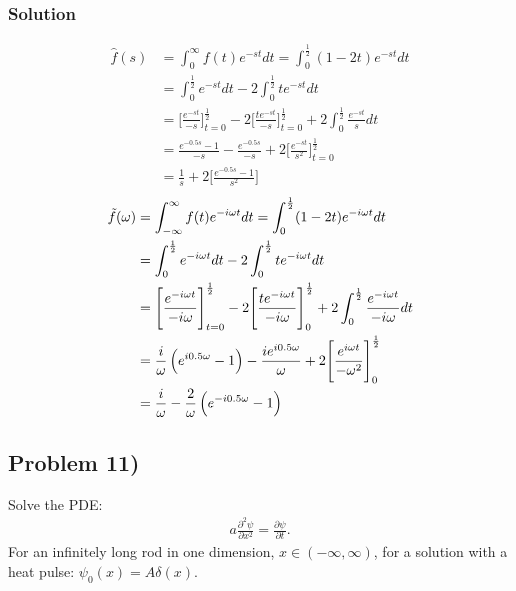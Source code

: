 \subsubsection*{Solution}
\begin{align*}
   \hat{f}(s) &= \int_0^\infty f(t)e^{-st}dt = \int_0^{\frac{1}{2}} (1 - 2t)e^{-st}dt\\
   &= \int_0^{\frac{1}{2}} e^{-st}dt - 2\int_0^{\frac{1}{2}} te^{-st}dt\\
   &= \Bigg[\frac{e^{-st}}{-s}\Bigg]_{t = 0}^{\frac{1}{2}} - 2 \Bigg[\frac{te^{-st}}{-s}\Bigg]_{t = 0}^{\frac{1}{2}} + 2\int_0^{\frac{1}{2}} \frac{e^{-st}}{s}dt\\
   &=\frac{e^{-0.5s} - 1}{-s} - \frac{e^{-0.5s}}{-s} + 2 \Bigg[\frac{e^{-st}}{s^2}\Bigg]_{t = 0}^\frac{1}{2}\\
   &=\frac{1}{s} + 2 \Bigg[\frac{e^{-0.5s} - 1}{s^2}\Bigg]
\end{align*}
\begin{align*}
    \tilde{f}(\omega) &= \int_{-\infty}^\infty f(t)e^{-i\omega t}dt = \int_0^{\frac{1}{2}} (1 - 2t)e^{-i\omega t}dt\\
    &=\int_0^{\frac{1}{2}}e^{-i\omega t}dt - 2\int_0^{\frac{1}{2}}te^{-i\omega t}dt\\
    &=\Bigg[\frac{e^{-i\omega t}}{-i\omega}\Bigg]_{t = 0}^\frac{1}{2} - 2\Bigg[\frac{te^{-i\omega t}}{-i\omega}\Bigg]_0^{\frac{1}{2}} + 2\int_{0}^\frac{1}{2}\frac{e^{-i\omega t}}{-i\omega}dt\\
    &=\frac{i}{\omega}\left(e^{i0.5\omega} - 1\right) - \frac{ie^{i0.5\omega}}{\omega} + 2\Bigg[\frac{e^{i\omega t}}{-\omega^2}\Bigg]_{0}^\frac{1}{2}\\
    &=\frac{i}{\omega} - \frac{2}{\omega}\left(e^{-i0.5\omega} - 1\right) 
\end{align*}

\subsection*{Problem 11)}
Solve the PDE:
\begin{align*}
    a \frac{\partial^2 \psi}{\partial x^2} = \frac{\partial \psi}{\partial t}.
\end{align*}For an infinitely long rod in one dimension, $x\in(-\infty, \infty)$, for a solution with a heat pulse: $\psi_0(x)=A\delta(x)$.

